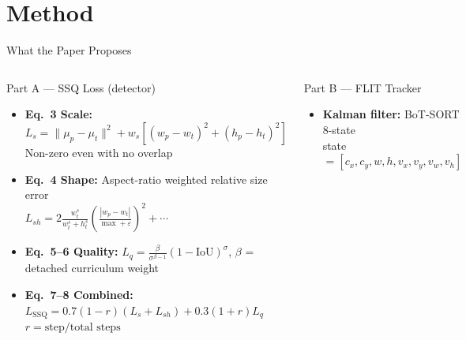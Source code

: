 \documentclass[aspectratio=169, 10pt]{beamer}
\begin{document}
\section{Method}

\begin{frame}{What the Paper Proposes}

  \begin{columns}[T]

    \begin{block}{Part A — SSQ Loss (detector)}
      \begin{itemize}
        \item \textbf{Eq.~3 Scale:}
          $L_s = \|\mu_p - \mu_t\|^2 + w_s\!\left[(w_p{-}w_t)^2 + (h_p{-}h_t)^2\right]$\\
          Non-zero even with no overlap

        \vspace{0.4em}
        \item \textbf{Eq.~4 Shape:}
          Aspect-ratio weighted relative size error\\
          $L_{sh} = 2\frac{w_t^s}{w_t^s+h_t^s}\!\left(\frac{|w_p-w_t|}{\max+\varepsilon}\right)^{\!2} + \cdots$

        \vspace{0.4em}
        \item \textbf{Eq.~5--6 Quality:}
          $L_q = \frac{\beta}{\sigma^{\beta-1}}(1-\text{IoU})^\sigma$,\;
          $\beta$ = detached curriculum weight

        \vspace{0.4em}
        \item \textbf{Eq.~7--8 Combined:}\\
          $L_{\text{SSQ}} = 0.7(1{-}r)(L_s{+}L_{sh}) + 0.3(1{+}r)L_q$\\
          $r = \text{step}/\text{total steps}$
      \end{itemize}
    \end{block}

    \begin{block}{Part B — FLIT Tracker}
      \begin{itemize}
        \item \textbf{Kalman filter:} BoT-SORT 8-state\\
          state $= [c_x, c_y, w, h, v_x, v_y, v_w, v_h]$


\end{itemize}
\end{block}
\end{columns}
\end{frame}
\end{document}
